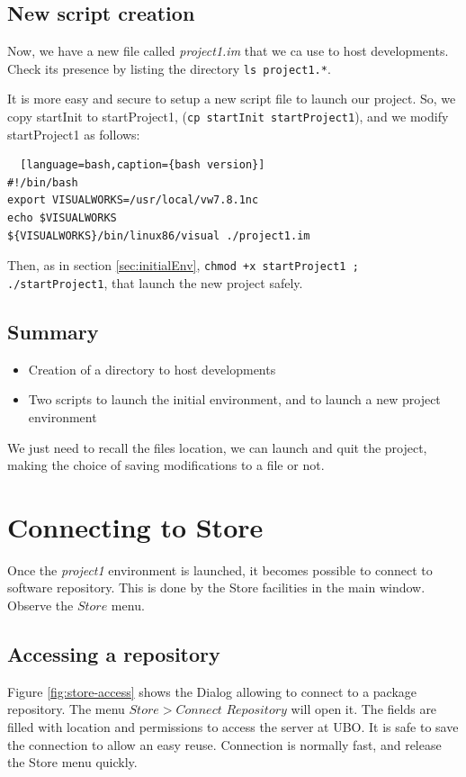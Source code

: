 \documentclass[times,a4paper]{book}
\begin{document}
\subsection {New script creation }

Now, we have a new file called {\sl project1.im} that we ca use to host developments.
Check its presence by listing the directory {\tt ls project1.*}. 

It is more easy and secure to setup a new script file to launch our project. So, we copy startInit to startProject1,
({\tt cp startInit startProject1}), and we modify startProject1 as follows:

\begin{lstlisting}  [language=bash,caption={bash version}]
#!/bin/bash
export VISUALWORKS=/usr/local/vw7.8.1nc
echo $VISUALWORKS
${VISUALWORKS}/bin/linux86/visual ./project1.im
\end{lstlisting}

Then, as in section \ref{sec:initialEnv}, {\tt chmod +x startProject1 ; ./startProject1}, that launch 
the new project safely.


\subsection{Summary}

\begin{itemize}
\item Creation of a directory to host developments
\item Two scripts to launch the initial environment, and to launch a new project environment
\end{itemize}

We just need to recall the files location, we can launch and quit the project, making the choice of
saving modifications to a file or not.
\section { Connecting to Store}


Once the {\sl project1} environment is launched, it becomes possible to connect to software repository.
This is done by the Store facilities in the main window. Observe the $Store$ menu.

\subsection {Accessing a repository }

Figure  \ref{fig:store-access} shows the Dialog allowing to connect to a package repository.
The menu $Store>Connect$ $Repository$ will open it. The fields are filled with location and permissions to
access the server at UBO. It is safe to save the connection to allow an easy reuse.
Connection is normally fast, and release the Store menu quickly.
\end{document}
